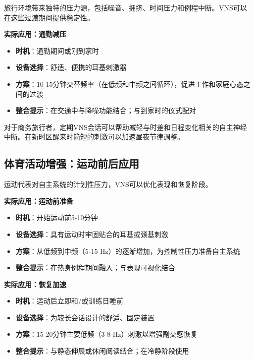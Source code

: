 \documentclass[
  Letterpaper,
]{scrbook}
\providecommand{\tightlist}{%
  \setlength{\itemsep}{0pt}\setlength{\parskip}{0pt}}\usepackage{longtable,booktabs,array}
\begin{document}
旅行环境带来独特的压力源，包括噪音、拥挤、时间压力和例程中断。VNS可以在这些过渡期间提供稳定性。

\textbf{实际应用：通勤减压}

\begin{itemize}
\tightlist
\item
  \textbf{时机}：通勤期间或刚到家时
\item
  \textbf{设备选择}：舒适、便携的耳基刺激器
\item
  \textbf{方案}：10-15分钟交替频率（在低频和中频之间循环），促进工作和家庭心态之间的过渡
\item
  \textbf{整合提示}：在交通中与降噪功能结合；与到家时的仪式配对
\end{itemize}

对于商务旅行者，定期VNS会话可以帮助减轻与时差和日程变化相关的自主神经中断。在新时区醒来时简短的刺激可以加速昼夜节律调整。

\subsection{体育活动增强：运动前后应用}\label{ux4f53ux80b2ux6d3bux52a8ux589eux5f3aux8fd0ux52a8ux524dux540eux5e94ux7528}

运动代表对自主系统的计划性压力，VNS可以优化表现和恢复阶段。

\textbf{实际应用：运动前准备}

\begin{itemize}
\tightlist
\item
  \textbf{时机}：开始运动前5-10分钟
\item
  \textbf{设备选择}：具有运动时牢固贴合的耳基或颈基刺激
\item
  \textbf{方案}：从低频到中频（5-15
  Hz）的逐渐增加，为控制性压力准备自主系统
\item
  \textbf{整合提示}：在热身例程期间融入；与表现可视化结合
\end{itemize}

\textbf{实际应用：恢复加速}

\begin{itemize}
\tightlist
\item
  \textbf{时机}：运动后立即和/或训练日睡前
\item
  \textbf{设备选择}：为较长会话设计的舒适、固定装置
\item
  \textbf{方案}：15-20分钟主要低频（3-8 Hz）刺激以增强副交感恢复
\item
  \textbf{整合提示}：与静态伸展或休闲阅读结合；在冷静阶段使用
\end{itemize}
\end{document}
